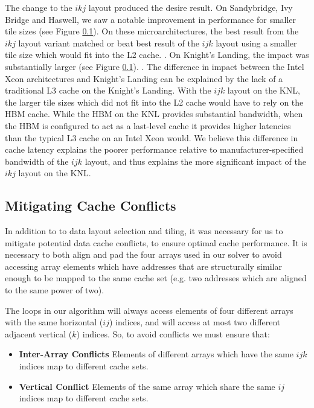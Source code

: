 \documentclass[conference]{IEEEtran}
\begin{document}
The change to the \(ikj\) layout produced the desire result. On Sandybridge,
Ivy Bridge and Haswell, we saw a notable improvement in performance for smaller
tile sizes (see Figure \ref{}). On these microarchitectures, the best result
from the \(ikj\) layout variant matched or beat best result of the \(ijk\)
layout using a smaller tile size which would fit into the L2 cache.
. On Knight's Landing, the impact was substantially
larger (see Figure \ref{}). . The difference in impact
between the Intel Xeon architectures and Knight's Landing can be explained by
the lack of a traditional L3 cache on the Knight's Landing. With the \(ijk\)
layout on the KNL, the larger tile sizes which did not fit into the L2 cache would
have to rely on the HBM cache. While the HBM on the KNL provides substantial
bandwidth, when the HBM is configured to act as a last-level cache it provides
higher latencies than the typical L3 cache on an Intel Xeon would. We believe
this difference in cache latency explains the poorer performance relative to
manufacturer-specified bandwidth of the \(ijk\) layout, and thus explains the
more significant impact of the \(ikj\) layout on the KNL.

\subsection{Mitigating Cache Conflicts}

In addition to to data layout selection and tiling, it was necessary for us to
mitigate potential data cache conflicts, to ensure optimal cache performance.
It is necessary to both align and pad the four arrays used in our solver to
avoid accessing array elements which have addresses that are structurally
similar enough to be mapped to the same cache set (e.g. two addresses which are
aligned to the same power of two).

The loops in our algorithm will always access elements of four different arrays
with the same horizontal (\(ij\)) indices, and will access at most two
different adjacent vertical (\(k\)) indices. So, to avoid conflicts we must ensure 
that:

\begin{itemize}
\item \textbf{Inter-Array Conflicts} Elements of different arrays which have the same \(ijk\) indices map to different cache sets.
\item \textbf{Vertical Conflict} Elements of the same array which share the same \(ij\) indices map to different cache sets.
\end{itemize}
\end{document}
